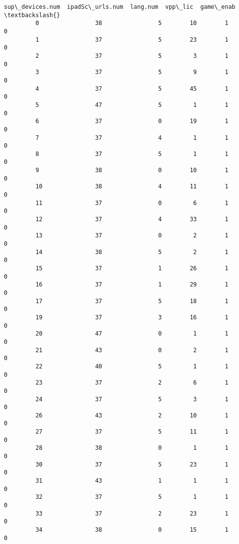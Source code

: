\documentclass[11pt]{article}
\begin{document}
\begin{Verbatim}[commandchars=\\\{\}]
             sup\_devices.num  ipadSc\_urls.num  lang.num  vpp\_lic  game\_enab  \textbackslash{}
         0                38                5        10        1          0   
         1                37                5        23        1          0   
         2                37                5         3        1          0   
         3                37                5         9        1          0   
         4                37                5        45        1          0   
         5                47                5         1        1          0   
         6                37                0        19        1          0   
         7                37                4         1        1          0   
         8                37                5         1        1          0   
         9                38                0        10        1          0   
         10               38                4        11        1          0   
         11               37                0         6        1          0   
         12               37                4        33        1          0   
         13               37                0         2        1          0   
         14               38                5         2        1          0   
         15               37                1        26        1          0   
         16               37                1        29        1          0   
         17               37                5        18        1          0   
         19               37                3        16        1          0   
         20               47                0         1        1          0   
         21               43                0         2        1          0   
         22               40                5         1        1          0   
         23               37                2         6        1          0   
         24               37                5         3        1          0   
         26               43                2        10        1          0   
         27               37                5        11        1          0   
         28               38                0         1        1          0   
         30               37                5        23        1          0   
         31               43                1         1        1          0   
         32               37                5         1        1          0   
         33               37                2        23        1          0   
         34               38                0        15        1          0   

\end{Verbatim}
\end{document}
